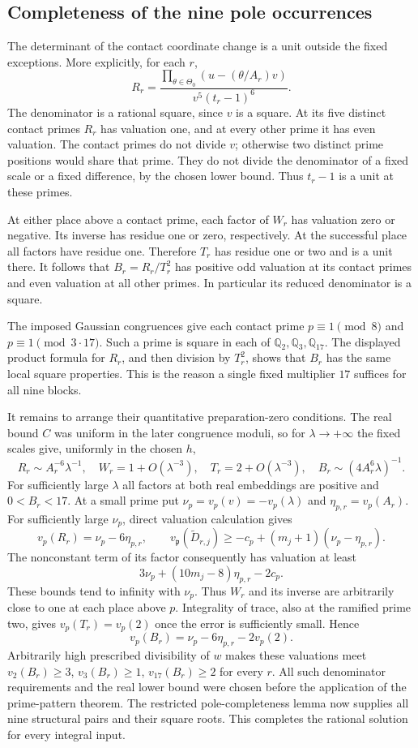 \subsection{Completeness of the nine pole occurrences}
The determinant of the contact coordinate change is a unit outside
the fixed exceptions. More explicitly, for each $r$,
\[
 R_r=\frac{\prod_{\theta\in\Theta_0}(u-(\theta/A_r)v)}
             {v^5(t_r-1)^6}.
\]
The denominator is a rational square, since $v$ is a square.
At its five distinct contact primes $R_r$ has valuation one, and
at every other prime it has even valuation. The contact primes do
not divide $v$; otherwise two distinct prime positions would share
that prime. They do not divide the denominator of a fixed scale or
a fixed difference, by the chosen lower bound. Thus $t_r-1$ is a
unit at these primes.

At either place above a contact prime, each factor of $W_r$ has
valuation zero or negative. Its inverse has residue one or zero,
respectively. At the successful place all factors have residue one.
Therefore $T_r$ has residue one or two and is a unit there. It follows
that $B_r=R_r/T_r^2$ has positive odd valuation at its contact primes
and even valuation at all other primes. In particular its reduced
denominator is a square.

The imposed Gaussian congruences give each contact prime
$p\equiv1\pmod8$ and $p\equiv1\pmod{3\cdot17}$. Such a prime is
square in each of $\mathbb Q_2,\mathbb Q_3,\mathbb Q_{17}$.
The displayed product formula for $R_r$, and then division by $T_r^2$,
shows that $B_r$ has the same local square properties. This is the
reason a single fixed multiplier $17$ suffices for all nine blocks.

It remains to arrange their quantitative preparation-zero conditions.
The real bound $C$ was uniform in the later congruence moduli, so for
$\lambda\to+\infty$ the fixed scales give, uniformly in the chosen $h$,
\[
 R_r\sim A_r^{-6}\lambda^{-1},\quad
 W_r=1+O(\lambda^{-3}),\quad T_r=2+O(\lambda^{-3}),\quad
 B_r\sim(4A_r^6\lambda)^{-1}.
\]
For sufficiently large $\lambda$ all factors at both real embeddings
are positive and $0<B_r<17$. At a small prime put
$\nu_p=v_p(v)=-v_p(\lambda)$ and $\eta_{p,r}=v_p(A_r)$.
For sufficiently large $\nu_p$, direct valuation calculation gives
\[
 v_p(R_r)=\nu_p-6\eta_{p,r},\qquad
 v_{\mathfrak p}(\widetilde D_{r,j})
 \ge-c_p+(m_j+1)(\nu_p-\eta_{p,r}).
\]
The nonconstant term of its factor consequently has valuation at least
\[
 3\nu_p+(10m_j-8)\eta_{p,r}-2c_p.
\]
These bounds tend to infinity with $\nu_p$. Thus $W_r$ and its inverse
are arbitrarily close to one at each place above $p$. Integrality of
trace, also at the ramified prime two, gives
$v_p(T_r)=v_p(2)$ once the error is sufficiently small. Hence
\[
 v_p(B_r)=\nu_p-6\eta_{p,r}-2v_p(2).
\]
Arbitrarily high prescribed divisibility of $w$ makes these valuations
meet $v_2(B_r)\ge3$, $v_3(B_r)\ge1$, $v_{17}(B_r)\ge2$ for every $r$.
All such denominator requirements and the real lower bound were chosen
before the application of the prime-pattern theorem. The restricted
pole-completeness lemma now supplies all nine structural pairs and
their square roots. This completes the rational solution for every
integral input.

